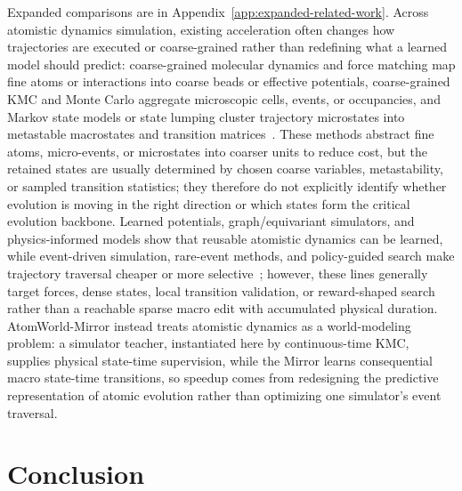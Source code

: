 \documentclass{article}
\begin{document}
Expanded comparisons are in Appendix~\ref{app:expanded-related-work}. Across atomistic dynamics simulation, existing acceleration often changes how trajectories are executed or coarse-grained rather than redefining what a learned model should predict: coarse-grained molecular dynamics and force matching map fine atoms or interactions into coarse beads or effective potentials, coarse-grained KMC and Monte Carlo aggregate microscopic cells, events, or occupancies, and Markov state models or state lumping cluster trajectory microstates into metastable macrostates and transition matrices~\cite{marrink2007martini,noid2008mscg,garnier2013cgkmc,chodera2014msm}. These methods abstract fine atoms, micro-events, or microstates into coarser units to reduce cost, but the retained states are usually determined by chosen coarse variables, metastability, or sampled transition statistics; they therefore do not explicitly identify whether evolution is moving in the right direction or which states form the critical evolution backbone. Learned potentials, graph/equivariant simulators, and physics-informed models show that reusable atomistic dynamics can be learned, while event-driven simulation, rare-event methods, and policy-guided search make trajectory traversal cheaper or more selective~\cite{behler2007nn,schutt2017schnet,batatia2022mace,zhang2018deeppotential,raissi2019pinn,pfaff2021meshgraphnets,bortz1975nfold,gillespie1977exact,li2019openkmc,voter1997hyperdynamics,schulman2017ppo,tang2024tks}; however, these lines generally target forces, dense states, local transition validation, or reward-shaped search rather than a reachable sparse macro edit with accumulated physical duration. AtomWorld-Mirror instead treats atomistic dynamics as a world-modeling problem: a simulator teacher, instantiated here by continuous-time KMC, supplies physical state-time supervision, while the Mirror learns consequential macro state-time transitions, so speedup comes from redesigning the predictive representation of atomic evolution rather than optimizing one simulator's event traversal.

\section{Conclusion}
\end{document}
